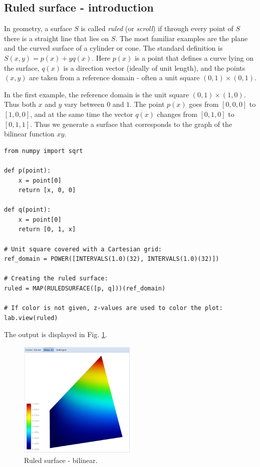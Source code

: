 \documentclass[article,A4,12pt]{llncs}
\begin{document}
\subsection{Ruled surface - introduction}

In geometry, a surface $S$ is called {\em ruled} (or {\em scroll}) if through every point of $S$ 
there is a straight line that lies on $S$. The most familiar examples are the plane and the curved 
surface of a cylinder or cone. The standard definition is $S(x, y) = p(x) + yq(x)$. Here $p(x)$ is 
a point that defines a curve lying on the surface, $q(x)$ is a direction vector (ideally of unit length), 
and the points $(x, y)$ are taken from a reference domain - often a unit square $(0, 1)\times (0, 1)$.

In the first example, the reference domain is the unit square 
$(0, 1)\times (1, 0)$. Thus both $x$ and $y$ vary between $0$ and $1$. 
The point $p(x)$ goes from $[0, 0, 0]$ to $[1, 0, 0]$, and at 
the same time the vector $q(x)$ changes from $[0, 1, 0]$
to $[0, 1, 1]$. Thus we generate a surface that corresponds
to the graph of the bilinear function $xy$.

\begin{verbatim}
from numpy import sqrt

def p(point):
    x = point[0]
    return [x, 0, 0]
  
def q(point):
    x = point[0]
    return [0, 1, x]

# Unit square covered with a Cartesian grid:  
ref_domain = POWER([INTERVALS(1.0)(32), INTERVALS(1.0)(32)])

# Creating the ruled surface:
ruled = MAP(RULEDSURFACE([p, q]))(ref_domain)

# If color is not given, z-values are used to color the plot:
lab.view(ruled)
\end{verbatim}
The output is displayed in Fig. \ref{fig:curves-6}.

\begin{figure}[!ht]
\begin{center}
\includegraphics[width=0.5\textwidth]{img/curves-6.png}
\end{center}
\vspace{-2mm}
\caption{Ruled surface - bilinear.}
\label{fig:curves-6}
\end{figure}
\end{document}
